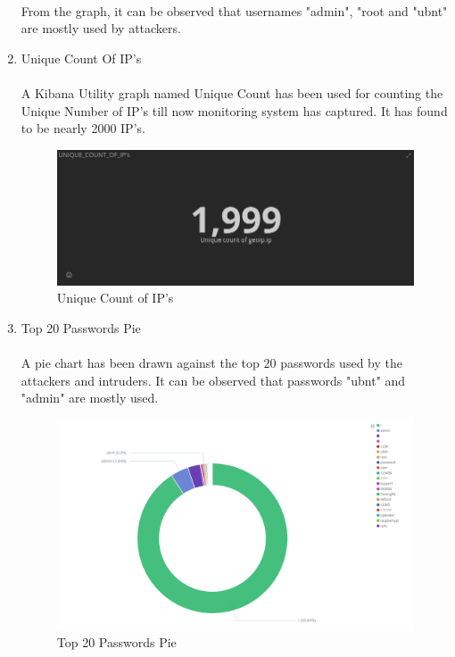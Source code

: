 \documentclass{report}
\begin{document}
\begin{enumerate}
\paragraph{}
From the graph, it can be observed that usernames "admin", "root and "ubnt" are mostly used by attackers.

\item Unique Count Of IP's
\paragraph{}
A Kibana Utility graph named Unique Count has been used for counting the Unique Number of IP's till now monitoring system has captured. It has found to be nearly 2000 IP's.

\begin{figure}[H]
\centering
\caption{Unique Count of IP's}
\includegraphics[scale=0.5]{Unique_IP}
\end{figure}

\item Top 20 Passwords Pie
\paragraph{}
A pie chart has been drawn against the top 20 passwords used by the attackers and intruders. It can be observed that passwords "ubnt" and "admin" are mostly used.

\begin{figure}[H]
\centering
\caption{Top 20 Passwords Pie}
\includegraphics[scale=0.29]{Passwords_Pie}
\end{figure}


\end{enumerate}
\end{document}
